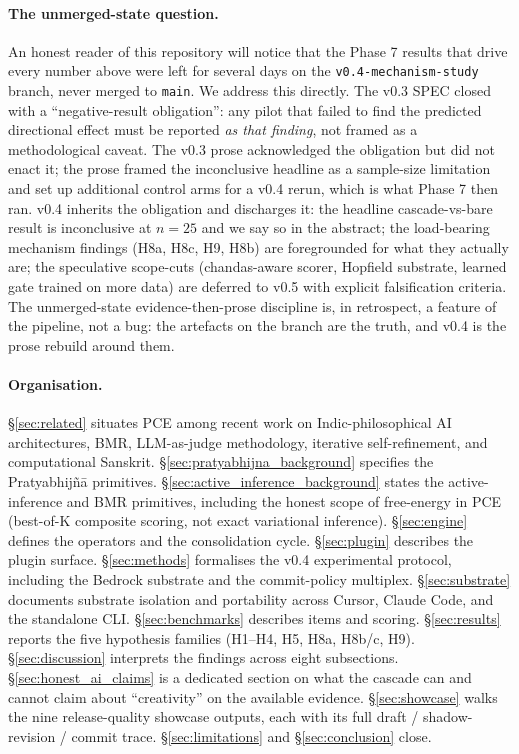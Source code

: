 \paragraph{The unmerged-state question.} An honest reader of this repository will notice that the Phase 7 results that drive every number above were left for several days on the \texttt{v0.4-mechanism-study} branch, never merged to \texttt{main}. We address this directly. The v0.3 SPEC closed with a ``negative-result obligation'': any pilot that failed to find the predicted directional effect must be reported \emph{as that finding}, not framed as a methodological caveat. The v0.3 prose acknowledged the obligation but did not enact it; the prose framed the inconclusive headline as a sample-size limitation and set up additional control arms for a v0.4 rerun, which is what Phase 7 then ran. v0.4 inherits the obligation and discharges it: the headline cascade-vs-bare result is inconclusive at $n=25$ and we say so in the abstract; the load-bearing mechanism findings (H8a, H8c, H9, H8b) are foregrounded for what they actually are; the speculative scope-cuts (chandas-aware scorer, Hopfield  substrate, learned gate trained on more data) are deferred to v0.5 with explicit falsification criteria. The unmerged-state evidence-then-prose discipline is, in retrospect, a feature of the pipeline, not a bug: the artefacts on the branch are the truth, and v0.4 is the prose rebuild around them.

\paragraph{Organisation.} \S\ref{sec:related} situates PCE among recent work on Indic-philosophical AI architectures, BMR, LLM-as-judge methodology, iterative self-refinement, and computational Sanskrit. \S\ref{sec:pratyabhijna_background} specifies the Pratyabhij\~n\=a primitives. \S\ref{sec:active_inference_background} states the active-inference and BMR primitives, including the honest scope of free-energy in PCE (best-of-K composite scoring, not exact variational inference). \S\ref{sec:engine} defines the operators and the consolidation cycle. \S\ref{sec:plugin} describes the plugin surface. \S\ref{sec:methods} formalises the v0.4 experimental protocol, including the Bedrock substrate and the commit-policy multiplex. \S\ref{sec:substrate} documents substrate isolation and portability across Cursor, Claude Code, and the standalone CLI. \S\ref{sec:benchmarks} describes items and scoring. \S\ref{sec:results} reports the five hypothesis families (H1--H4, H5, H8a, H8b/c, H9). \S\ref{sec:discussion} interprets the findings across eight subsections. \S\ref{sec:honest_ai_claims} is a dedicated section on what the cascade can and cannot claim about ``creativity'' on the available evidence. \S\ref{sec:showcase} walks the nine release-quality showcase outputs, each with its full draft / shadow-revision / commit trace. \S\ref{sec:limitations} and \S\ref{sec:conclusion} close.
